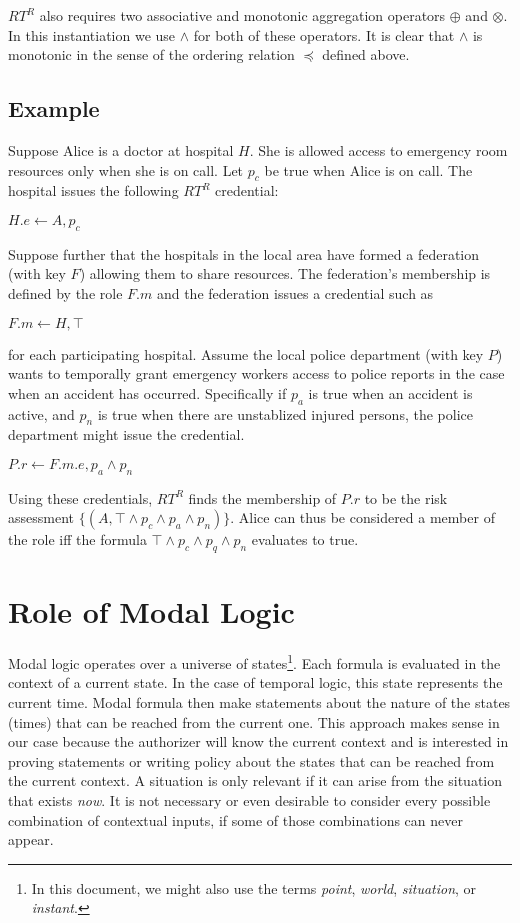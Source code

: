 \documentclass{article}
\newcommand{\po}{\preccurlyeq}
\begin{document}
$RT^R$ also requires two associative and monotonic aggregation operators $\oplus$ and $\otimes$.
In this instantiation we use $\wedge$ for both of these operators. It is clear that $\wedge$ is
monotonic in the sense of the ordering relation $\po$ defined above.

\subsection{Example}

Suppose Alice is a doctor at hospital $H$. She is allowed access to emergency room resources
only when she is on call. Let $p_c$ be true when Alice is on call. The hospital issues the
following $RT^R$ credential:

$H.e \leftarrow A, p_c$

Suppose further that the hospitals in the local area have formed a federation (with key $F$)
allowing them to share resources. The federation's membership is defined by the role $F.m$ and
the federation issues a credential such as

$F.m \leftarrow H, \top$

for each participating hospital. Assume the local police department (with key $P$) wants to
temporally grant emergency workers access to police reports in the case when an accident has
occurred. Specifically if $p_a$ is true when an accident is active, and $p_n$ is true when there
are unstablized injured persons, the police department might issue the credential.

$P.r \leftarrow F.m.e, p_a \wedge p_n$

Using these credentials, $RT^R$ finds the membership of $P.r$ to be the risk assessment $\{ (A,
\top \wedge p_c \wedge p_a \wedge p_n) \}$. Alice can thus be considered a member of the role
iff the formula $\top \wedge p_c \wedge p_q \wedge p_n$ evaluates to true.

\section{Role of Modal Logic}

Modal logic operates over a universe of states\footnote{In this document, we might also use the
  terms \textit{point}, \textit{world}, \textit{situation}, or \textit{instant}.}. Each formula
is evaluated in the context of a current state. In the case of temporal logic, this state
represents the current time. Modal formula then make statements about the nature of the states
(times) that can be reached from the current one. This approach makes sense in our case because
the authorizer will know the current context and is interested in proving statements or writing
policy about the states that can be reached from the current context. A situation is only
relevant if it can arise from the situation that exists \emph{now}. It is not necessary or even
desirable to consider every possible combination of contextual inputs, if some of those
combinations can never appear.
\end{document}
